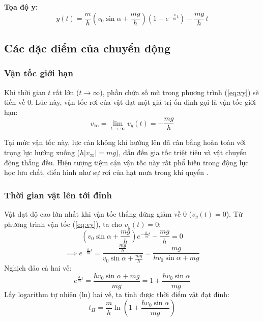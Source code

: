 \textbf{Tọa độ y:}
\begin{equation}
y(t) = \frac{m}{h}\left(v_0\sin\alpha + \frac{mg}{h}\right)\left(1 - e^{-\frac{h}{m}t}\right) - \frac{mg}{h}\,t
\label{eq:y}
\end{equation}


\subsection{Các đặc điểm của chuyển động}

\subsubsection{Vận tốc giới hạn}
Khi thời gian $t$ rất lớn ($t \to \infty$), phần chứa số mũ trong phương trình (\ref{eq:vy}) sẽ tiến về 0. Lúc này, vận tốc rơi của vật đạt một giá trị ổn định gọi là vận tốc giới hạn:
\begin{equation}
v_\infty = \lim_{t \to \infty} v_y(t) = -\frac{mg}{h}
\label{eq:terminal}
\end{equation}

Tại mức vận tốc này, lực cản không khí hướng lên đã cân bằng hoàn toàn với trọng lực hướng xuống ($h|v_\infty| = mg$), dẫn đến gia tốc triệt tiêu và vật chuyển động thẳng đều. Hiện tượng tiệm cận vận tốc này rất phổ biến trong động lực học lưu chất, điển hình như sự rơi của hạt mưa trong khí quyển \cite{serway2008physics}.

\subsubsection{Thời gian vật lên tới đỉnh}
Vật đạt độ cao lớn nhất khi vận tốc thẳng đứng giảm về 0 ($v_y(t) = 0$). Từ phương trình vận tốc (\ref{eq:vy}), ta cho $v_y(t) = 0$:
\begin{equation*}
\left(v_0\sin\alpha + \frac{mg}{h}\right)e^{-\frac{h}{m}t} - \frac{mg}{h} = 0
\end{equation*}
\begin{equation*}
\implies e^{-\frac{h}{m}t} = \frac{\frac{mg}{h}}{v_0\sin\alpha + \frac{mg}{h}} = \frac{mg}{hv_0\sin\alpha + mg}
\end{equation*}
Nghịch đảo cả hai vế:
\begin{equation*}
e^{\frac{h}{m}t} = \frac{hv_0\sin\alpha + mg}{mg} = 1 + \frac{hv_0\sin\alpha}{mg}
\end{equation*}
Lấy logarithm tự nhiên (ln) hai vế, ta tính được thời điểm vật đạt đỉnh:
\begin{equation}
t_{H} = \frac{m}{h}\ln\left(1 + \frac{h v_0\sin\alpha}{mg}\right)
\label{eq:tmax}
\end{equation}

